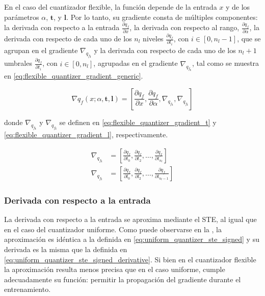 En el caso del cuantizador flexible, la función depende de la entrada $x$ y de los parámetros $\alpha$, $\mathbf{t}$, y $\mathbf{l}$. Por lo tanto, su gradiente consta de m\'ultiples componentes: la derivada con respecto a la entrada $\frac{\partial q_f}{\partial x}$, la derivada con respecto al rango, $\frac{\partial q_f}{\partial \alpha}$, la derivada con respecto de cada uno de los $n_{l}$ niveles $\frac{\partial q_f}{\partial l_i}$, con $i \in [0, n_{l}-1]$, que se agrupan en el gradiente $\nabla_{q_{f_\mathbf{l}}}$ y la derivada con respecto de cada uno de los $n_{l} + 1$ umbrales $\frac{\partial q_f}{\partial t_i}$, con $i \in [0, n_{l}]$, agrupadas en el gradiente $\nabla_{q_{f_\mathbf{t}}}$, tal como se muestra en \eqref{eq:flexible_quantizer_gradient_generic}.

\begin{equation}
    \label{eq:flexible_quantizer_gradient_generic}
    \nabla q_f\left(x; \alpha, \mathbf{t}, \mathbf{l}\right) =
    \left[
    \frac{\partial q_f}{\partial x},
    \frac{\partial q_f}{\partial \alpha},
    \nabla_{q_{f_\mathbf{t}}},
    \nabla_{q_{f_\mathbf{l}}}
    \right]
\end{equation}

donde $\nabla_{q_{f_\mathbf{t}}}$ y $\nabla_{q_{f_\mathbf{l}}}$ se definen en \eqref{eq:flexible_quantizer_gradient_t} y \eqref{eq:flexible_quantizer_gradient_l}, respectivamente.

\begin{align}
    \nabla_{q_{f_\mathbf{t}}} &= \left[ \frac{\partial q_f}{\partial t_0}, \frac{\partial q_f}{\partial t_2}, \dots, \frac{\partial q_f}{\partial t_{n_{l}}} \right] \label{eq:flexible_quantizer_gradient_t} \\
    \nabla_{q_{f_\mathbf{l}}} &= \left[ \frac{\partial q_f}{\partial l_0}, \frac{\partial q_f}{\partial l_2}, \dots, \frac{\partial q_f}{\partial l_{n_{l}-1}} \right] \label{eq:flexible_quantizer_gradient_l}
\end{align}


\subsubsection{Derivada con respecto a la entrada}
La derivada con respecto a la entrada se aproxima mediante el STE, al igual que en el caso del cuantizador uniforme. Como puede observarse en la , la aproximación es idéntica a la definida en \eqref{eq:uniform_quantizer_ste_signed} y su derivada es la misma que la definida en \eqref{eq:uniform_quantizer_ste_signed_derivative}. Si bien en el cuantizador flexible la aproximación resulta menos precisa que en el caso uniforme, cumple adecuadamente su función: permitir la propagación del gradiente durante el entrenamiento.

